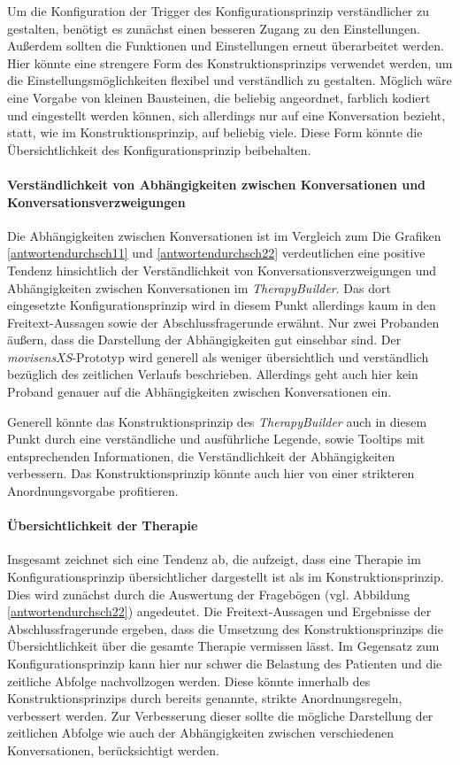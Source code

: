 Um die Konfiguration der Trigger des Konfigurationsprinzip verständlicher zu gestalten, benötigt es zunächst einen besseren Zugang zu den Einstellungen. Außerdem sollten die Funktionen und Einstellungen erneut überarbeitet werden. Hier könnte eine strengere Form des Konstruktionsprinzips verwendet werden, um die Einstellungsmöglichkeiten flexibel und verständlich zu gestalten. Möglich wäre eine Vorgabe von kleinen Bausteinen, die beliebig angeordnet, farblich kodiert und eingestellt werden können, sich allerdings nur auf eine Konversation bezieht, statt, wie im Konstruktionsprinzip, auf beliebig viele. Diese Form könnte die Übersichtlichkeit des Konfigurationsprinzip beibehalten.


\paragraph{Verständlichkeit von Abhängigkeiten zwischen Konversationen und Konversationsverzweigungen}
Die Abhängigkeiten zwischen Konversationen ist im Vergleich zum 
Die Grafiken \ref{antwortendurchsch11} und \ref{antwortendurchsch22} verdeutlichen eine positive Tendenz hinsichtlich der Verständlichkeit von Konversationsverzweigungen und Abhängigkeiten zwischen Konversationen im \emph{TherapyBuilder}. Das dort eingesetzte Konfigurationsprinzip wird in diesem Punkt allerdings kaum in den Freitext-Aussagen sowie der Abschlussfragerunde erwähnt. Nur zwei Probanden äußern, dass die Darstellung der Abhängigkeiten gut einsehbar sind. Der \emph{movisensXS}-Prototyp wird generell als weniger übersichtlich und verständlich bezüglich des zeitlichen Verlaufs beschrieben. Allerdings geht auch hier kein Proband genauer auf die Abhängigkeiten zwischen Konversationen ein. 

Generell könnte das Konstruktionsprinzip des \emph{TherapyBuilder} auch in diesem Punkt durch eine verständliche und ausführliche Legende, sowie Tooltips mit entsprechenden Informationen, die Verständlichkeit der Abhängigkeiten verbessern. Das Konstruktionsprinzip könnte auch hier von einer strikteren Anordnungsvorgabe profitieren. 

\paragraph{Übersichtlichkeit der Therapie}
Insgesamt zeichnet sich eine Tendenz ab, die aufzeigt, dass eine Therapie im Konfigurationsprinzip übersichtlicher dargestellt ist als im Konstruktionsprinzip. Dies wird zunächst durch die Auswertung der Fragebögen (vgl. Abbildung \ref{antwortendurchsch22}) angedeutet. Die Freitext-Aussagen und Ergebnisse der Abschlussfragerunde ergeben, dass die Umsetzung des Konstruktionsprinzips die Übersichtlichkeit über die gesamte Therapie vermissen lässt. Im Gegensatz zum Konfigurationsprinzip kann hier nur schwer die Belastung des Patienten und die zeitliche Abfolge nachvollzogen werden. Diese könnte innerhalb des Konstruktionsprinzips durch bereits genannte, strikte Anordnungsregeln, verbessert werden. Zur Verbesserung dieser sollte die mögliche Darstellung der zeitlichen Abfolge wie auch der Abhängigkeiten zwischen verschiedenen Konversationen, berücksichtigt werden.




